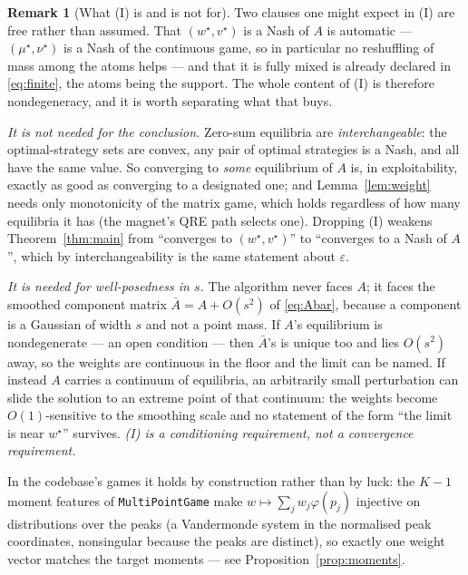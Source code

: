 \documentclass[11pt]{article}
\theoremstyle{definition}
\newtheorem{remark}{Remark}
\begin{document}
\begin{remark}[What (I) is and is not for]\label{rem:nondeg}
Two clauses one might expect in (I) are free rather than assumed. That
$(w^\star, v^\star)$ is a Nash of $A$ is automatic --- $(\mu^\star,\nu^\star)$ is a
Nash of the continuous game, so in particular no reshuffling of mass among the
atoms helps --- and that it is fully mixed is already declared in
\eqref{eq:finite}, the atoms being the support. The whole content of (I) is
therefore nondegeneracy, and it is worth separating what that buys.

\emph{It is not needed for the conclusion.} Zero-sum equilibria are
\emph{interchangeable}: the optimal-strategy sets are convex, any pair of
optimal strategies is a Nash, and all have the same value. So converging to
\emph{some} equilibrium of $A$ is, in exploitability, exactly as good as
converging to a designated one; and Lemma~\ref{lem:weight} needs only
monotonicity of the matrix game, which holds regardless of how many equilibria
it has (the magnet's QRE path selects one). Dropping (I) weakens
Theorem~\ref{thm:main} from ``converges to $(w^\star,v^\star)$'' to ``converges
to a Nash of $A$'', which by interchangeability is the same statement about
$\varepsilon$.

\emph{It is needed for well-posedness in $s$.} The algorithm never faces $A$; it
faces the smoothed component matrix $\bar A = A + O(s^2)$ of \eqref{eq:Abar},
because a component is a Gaussian of width $s$ and not a point mass. If $A$'s
equilibrium is nondegenerate --- an open condition --- then $\bar A$'s is unique too
and lies $O(s^2)$ away, so the weights are continuous in the floor and the limit
can be named. If instead $A$ carries a continuum of equilibria, an arbitrarily
small perturbation can slide the solution to an extreme point of that continuum:
the weights become $O(1)$-sensitive to the smoothing scale and no statement of
the form ``the limit is near $w^\star$'' survives. \emph{(I) is a conditioning
requirement, not a convergence requirement.}

In the codebase's games it holds by construction rather than by luck: the
$K-1$ moment features of \texttt{MultiPointGame} make $w \mapsto \sum_j w_j
\varphi(p_j)$ injective on distributions over the peaks (a Vandermonde system in
the normalised peak coordinates, nonsingular because the peaks are distinct), so
exactly one weight vector matches the target moments --- see
Proposition~\ref{prop:moments}.
\end{remark}
\end{document}

